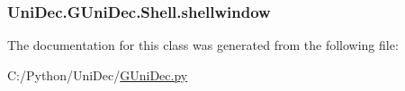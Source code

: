 \subsubsection[{shellwindow}]{\setlength{\rightskip}{0pt plus 5cm}Uni\+Dec.\+G\+Uni\+Dec.\+Shell.\+shellwindow}\label{class_uni_dec_1_1_g_uni_dec_1_1_shell_a92e1e6e9000ee5b99a6118dd48753548}


The documentation for this class was generated from the following file\+:\begin{DoxyCompactItemize}
\item 
C\+:/\+Python/\+Uni\+Dec/\hyperlink{_g_uni_dec_8py}{G\+Uni\+Dec.\+py}\end{DoxyCompactItemize}
